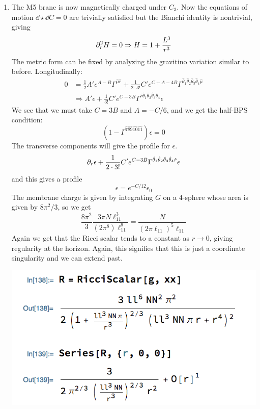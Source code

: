 \documentclass[11pt, class=article, crop=false]{standalone}
\begin{document}
\begin{enumerate}
	\item The M5 brane is now magnetically charged under $C_3$. Now the equations of motion $\dd \star \dd C = 0$ are trivially satisfied but the Bianchi identity is nontrivial, giving
	\[
		\partial^2_r H = 0 \Rightarrow H = 1 + \frac{L^3}{r^3}
	\]
	The metric form can be fixed by analyzing the gravitino variation similar to before. Longitudinally:
	\[
	\begin{aligned}
		0 &= \frac12 A' e^{A-B} \Gamma^{\hat \mu \hat r} + \frac{1}{2 \cdot 3!} C' e^{C+A-4B} \Gamma^{\hat \theta_1 \hat \theta_2 \hat \theta_3 \hat \theta_4 \hat \mu}\\
		&\Rightarrow A' \epsilon + \frac{1}{3!} C' e^{C-3B} \Gamma^{\hat r \hat \theta_1 \hat \theta_2 \hat \theta_3 \hat \theta_4 } \epsilon
	\end{aligned}
	\]
	We see that we must take $C = 3B$ and $A=-C/6$, and we get the half-BPS condition:
	\[
		(1 - \Gamma^{\hat 7 \hat 8 \hat 9 \hat{10} \hat{11}}) \epsilon = 0
	\]
	 The transverse components will give the profile for $\epsilon$.
	\[
		\partial_r \epsilon + \frac{1}{2 \cdot 3!} C' e^{C-3B} \Gamma^{\hat \theta_1 \hat \theta_2 \hat \theta_3 \hat \theta_4 \hat r}  \epsilon
	\] 
	and this gives a profile 
	\[
		\epsilon = e^{-C/12} \epsilon_0
	\]
	The membrane charge is given by integrating $G$ on a $4$-sphere whose area is given by $8\pi^2/3$, so we get
	\[
		\frac{8\pi^2}{3} \frac{3 \pi N \ell_{11}^3}{(2\pi^8) \ell_{11}^9} = \frac{N}{(2\pi \ell_{11})^5 \ell_{11}}
	\]
	Again we get that the Ricci scalar tends to a constant as $r \to 0$, giving regularity at the horizon. Again, this signifies that this is just a coordinate singularity and we can extend past. 
	\begin{center}
		\includegraphics[scale=0.5]{"Figures/M5 Ricci"}
	\end{center}
	

\end{enumerate}
\end{document}
